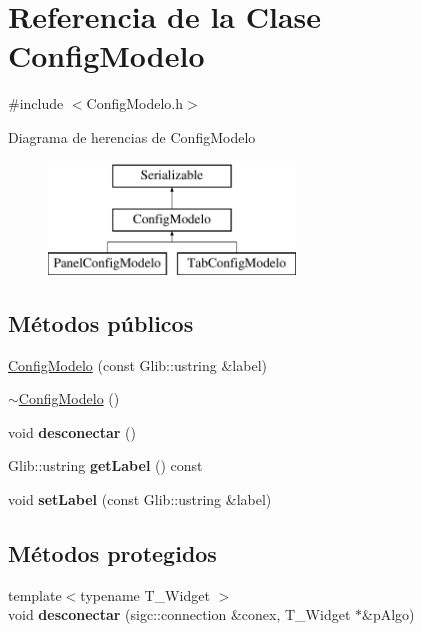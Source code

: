 \hypertarget{classConfigModelo}{\section{\-Referencia de la \-Clase \-Config\-Modelo}
\label{classConfigModelo}
}


{\ttfamily \#include $<$\-Config\-Modelo.\-h$>$}

\-Diagrama de herencias de \-Config\-Modelo\begin{figure}[H]
\begin{center}
\leavevmode
\includegraphics[height=3.000000cm]{classConfigModelo}
\end{center}
\end{figure}
\subsection*{\-Métodos públicos}
\begin{DoxyCompactItemize}
\item 
\hyperlink{classConfigModelo_a128c0b7edc981b8c7f6e5d8f3ee8e9eb}{\-Config\-Modelo} (const \-Glib\-::ustring \&label)
\item 
\hyperlink{classConfigModelo_a5425d7855cf55abe9c8955b92ee9e802}{$\sim$\-Config\-Modelo} ()
\item 
\hypertarget{classConfigModelo_a94d779e447527f246e31f3b65bd28d03}{void {\bfseries desconectar} ()}\label{classConfigModelo_a94d779e447527f246e31f3b65bd28d03}

\item 
\hypertarget{classConfigModelo_a4bed8ed3f91ef9c2bb1064391c2dad8d}{\-Glib\-::ustring {\bfseries get\-Label} () const }\label{classConfigModelo_a4bed8ed3f91ef9c2bb1064391c2dad8d}

\item 
\hypertarget{classConfigModelo_addc4c60afe8773f540c7c672312b5f55}{void {\bfseries set\-Label} (const \-Glib\-::ustring \&label)}\label{classConfigModelo_addc4c60afe8773f540c7c672312b5f55}

\end{DoxyCompactItemize}
\subsection*{\-Métodos protegidos}
\begin{DoxyCompactItemize}
\item 
\hypertarget{classConfigModelo_a40b9aa7742ba791440af155a1055aa24}{{\footnotesize template$<$typename T\-\_\-\-Widget $>$ }\\void {\bfseries desconectar} (sigc\-::connection \&conex, \-T\-\_\-\-Widget $\ast$\&p\-Algo)}\label{classConfigModelo_a40b9aa7742ba791440af155a1055aa24}

\end{DoxyCompactItemize}


